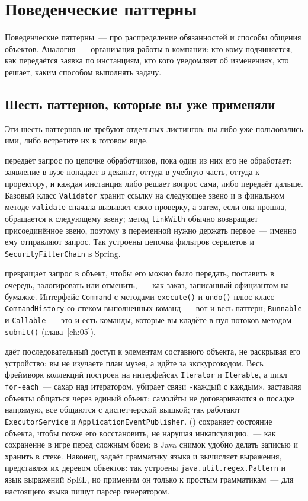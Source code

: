 \section{Поведенческие паттерны}

Поведенческие паттерны~--- про распределение обязанностей и способы общения
объектов. Аналогия~--- организация работы в компании: кто кому подчиняется, как
передаётся заявка по инстанциям, кто кого уведомляет об изменениях, кто решает,
каким способом выполнять задачу.

\subsection{Шесть паттернов, которые вы уже применяли}

Эти шесть паттернов не требуют отдельных листингов: вы либо уже пользовались
ими, либо встретите их в готовом виде.

 передаёт запрос по цепочке обработчиков, пока один
из них его не обработает: заявление в вузе попадает в деканат, оттуда в учебную
часть, оттуда к проректору, и каждая инстанция либо решает вопрос сама, либо
передаёт дальше. Базовый класс \texttt{Validator} хранит ссылку на следующее
звено и в финальном методе \texttt{validate} сначала вызывает свою проверку, а
затем, если она прошла, обращается к следующему звену; метод \texttt{linkWith}
обычно возвращает присоединённое звено, поэтому в переменной нужно держать
первое~--- именно ему отправляют запрос. Так устроены цепочка фильтров сервлетов
и \texttt{SecurityFilterChain} в Spring.

 превращает запрос в объект, чтобы его можно было передать,
поставить в очередь, залогировать или отменить,~--- как заказ, записанный
официантом на бумажке. Интерфейс \texttt{Command} с методами \texttt{execute()}
и \texttt{undo()} плюс класс \texttt{CommandHistory} со стеком выполненных
команд~--- вот и весь паттерн; \texttt{Runnable} и \texttt{Callable}~--- это и
есть команды, которые вы кладёте в пул потоков методом \texttt{submit()}
(глава~\ref{ch:05}).

 даёт последовательный доступ к элементам составного объекта, не
раскрывая его устройство: вы не изучаете план музея, а идёте за экскурсоводом.
Весь фреймворк коллекций построен на интерфейсах \texttt{Iterator} и
\texttt{Iterable}, а цикл \texttt{for-each}~--- сахар над итератором.
 убирает связи «каждый с каждым», заставляя объекты общаться
через единый объект: самолёты не договариваются о посадке напрямую, все общаются
с диспетчерской вышкой; так работают \texttt{ExecutorService} и
\texttt{ApplicationEventPublisher}.  () сохраняет
состояние объекта, чтобы позже его восстановить, не нарушая инкапсуляцию,~---
как сохранение в игре перед сложным боем; в Java снимок удобно делать записью и
хранить в стеке. Наконец,  задаёт грамматику языка и
вычисляет выражения, представляя их деревом объектов: так устроены
\texttt{java.util.regex.Pattern} и язык выражений SpEL, но применим он только к
простым грамматикам~--- для настоящего языка пишут парсер генератором.


